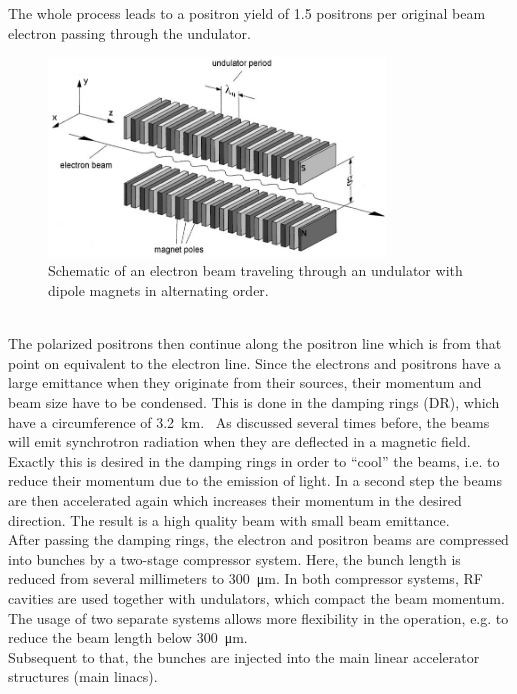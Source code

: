 The whole process leads to a positron yield of 1.5 positrons per original beam electron passing through the undulator.~\cite{Ushakov}
\begin{figure}
\centering
\includegraphics[width=0.8\textwidth]{Figures/Undulator_edited.png}
\caption[Schematic layout of an undulator]{Schematic of an electron beam traveling through an undulator with dipole magnets in alternating order.~\cite[cf. p. 41]{Wille}}
\label{fig:Undulator}
\end{figure}
\\The polarized positrons then continue along the positron line which is from that point on equivalent to the electron line.
Since the electrons and positrons have a large emittance when they originate from their sources, their momentum and beam size have to be condensed.
This is done in the damping rings (DR), which have a circumference of \SI{3.2}{\kilo\meter}.~\cite[p. 14]{TDR32}
As discussed several times before, the beams will emit synchrotron radiation when they are deflected in a magnetic field.
Exactly this is desired in the damping rings in order to ``cool'' the beams, i.e. to reduce their momentum due to the emission of light.
In a second step the beams are then accelerated again which increases their momentum in the desired direction.
The result is a high quality beam with small beam emittance.\\
After passing the damping rings, the electron and positron beams are compressed into bunches by a two-stage compressor system.
Here, the bunch length is reduced from several millimeters to \SI{300}{\micro\meter}.
In both compressor systems, RF cavities are used together with undulators, which compact the beam momentum.
The usage of two separate systems allows more flexibility in the operation, e.g. to reduce the beam length below \SI{300}{\micro\meter}.~\cite[p. 124]{TDR32}\\
Subsequent to that, the bunches are injected into the main linear accelerator structures (main linacs).
